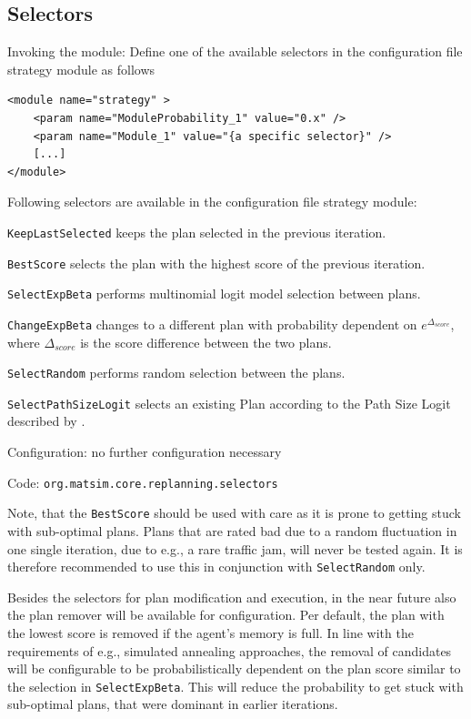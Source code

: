 \subsection{Selectors}
\label{sec:selectors}
\begin{compactitem}
\item Invoking the module: Define one of the available selectors in the configuration file strategy module as follows
%
\begin{lstlisting}
<module name="strategy" >
    <param name="ModuleProbability_1" value="0.x" />
    <param name="Module_1" value="{a specific selector}" />
    [...]
</module>
\end{lstlisting}
%
Following selectors are available in the configuration file strategy module:
%
\begin{compactitem}
	\item \lstinline|KeepLastSelected| keeps the plan selected in the previous iteration.
	\item \lstinline|BestScore| selects the plan with the highest score of the previous iteration.
	\item \lstinline|SelectExpBeta| performs multinomial logit model selection between plans.
	\item \lstinline|ChangeExpBeta| changes to a different plan with probability dependent on $e^{\Delta_{score}}$, where $\Delta_{score}$ is the score difference between the two plans.
	\item \lstinline|SelectRandom| performs random selection between the plans.
	\item \lstinline|SelectPathSizeLogit| selects an existing Plan according to the Path Size Logit described by \citet[][]{FrejingerBierlaire_TransResB_2007}.
\end{compactitem}
%
\item Configuration: no further configuration necessary 
\item Code: \lstinline|org.matsim.core.replanning.selectors|
\end{compactitem}

Note, that the \lstinline|BestScore| should be used with care as it is prone to getting stuck with sub-optimal plans. Plans that are rated bad due to a random fluctuation in one single iteration, due to e.g., a rare traffic jam, will never be tested again. It is therefore recommended to use this in conjunction with \lstinline|SelectRandom| only.

Besides the selectors for plan modification and execution, in the near future also the plan remover will be available for configuration. Per default, the plan with the lowest score is removed if the agent's memory is full. In line with the requirements of e.g., simulated annealing approaches, the removal of candidates will be configurable to be probabilistically dependent on the plan score similar to the selection in \lstinline|SelectExpBeta|. This will reduce the probability to get stuck with sub-optimal plans, that were dominant in earlier iterations.

